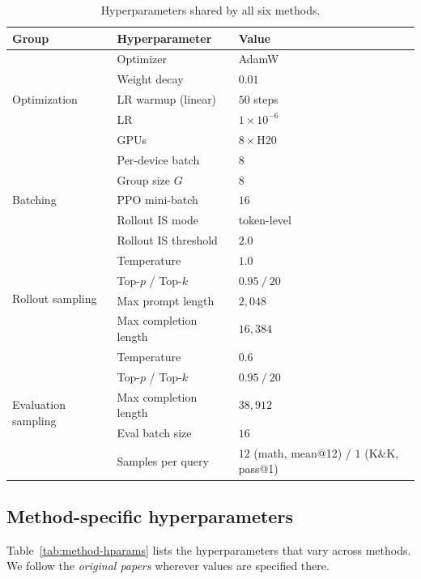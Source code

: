   \begin{table}[h]
  \centering
  \small
  \caption{Hyperparameters shared by all six methods. }
  \label{tab:shared-hparams}
  \begin{tabular}{lll}
  \toprule
  Group & Hyperparameter & Value \\
  \midrule
  \multirow{5}{*}{Optimization}
    & Optimizer            & AdamW \\
    & Weight decay         & $0.01$ \\
    & LR warmup (linear)   & $50$ steps \\
    & LR   & $1 \times 10^{-6}$ \\
    & GPUs                 & $8\times$H20 \\
  \midrule
  \multirow{5}{*}{Batching}
    & Per-device batch     & $8$ \\
    & Group size $G$       & $8$ \\
    & PPO mini-batch       & $16$ \\
    & Rollout IS mode      & token-level \\
    & Rollout IS threshold & $2.0$ \\
  \midrule
  \multirow{4}{*}{Rollout sampling}
    & Temperature          & $1.0$ \\
    & Top-$p$ / Top-$k$    & $0.95\ /\ 20$ \\
    & Max prompt length    & $2{,}048$ \\
    & Max completion length & $16{,}384$ \\
  \midrule
  \multirow{5}{*}{Evaluation sampling}
    & Temperature                  & $0.6$ \\
    & Top-$p$ / Top-$k$            & $0.95\ /\ 20$ \\
    & Max completion length        & $38{,}912$ \\
    & Eval batch size              & $16$ \\
    & Samples per query            & $12$ (math, mean@12) / $1$ (K\&K, pass@1) \\
  \bottomrule
  \end{tabular}
  \end{table}



  \subsection{Method-specific hyperparameters}
  \label{app:method-hparams}

  Table~\ref{tab:method-hparams} lists the hyperparameters that vary
  across methods. We follow the \emph{original papers} wherever values are specified there.


